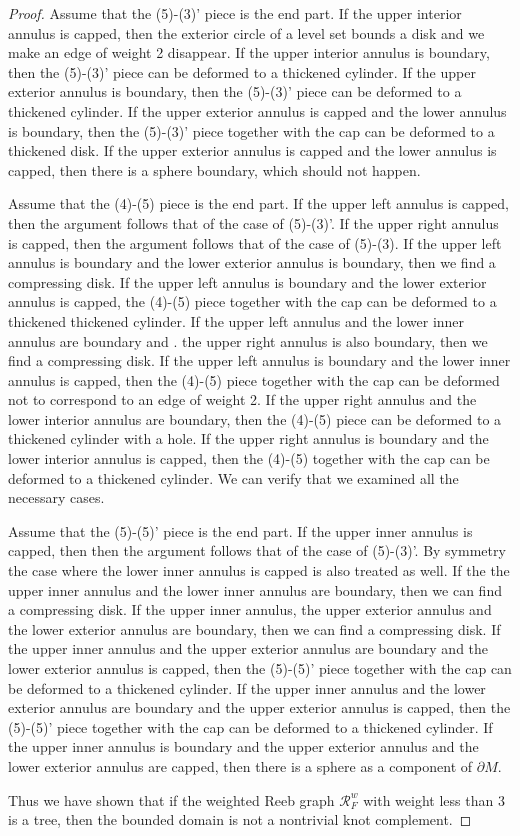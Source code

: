 \documentclass{amsart}
\numberwithin{equation}{section}
\newcommand{\bd}{\partial}
\begin{document}
\begin{proof}
Assume that the (5)-(3)' piece is the end part.
If the upper interior annulus is capped, then the exterior circle of a level set bounds a disk and we make an edge of weight 2 disappear. 
If the upper interior annulus is boundary,  then the (5)-(3)' piece can be deformed to a thickened cylinder.
If the upper exterior annulus is boundary, then the (5)-(3)' piece can be deformed to a thickened cylinder. 
If the upper exterior annulus is capped and the lower annulus is boundary,
then the (5)-(3)' piece together with the cap can be deformed to a thickened disk.
If the upper exterior annulus is capped and the lower annulus is capped,
then there is a sphere boundary, which should not happen.

Assume that the (4)-(5) piece is the end part.
If the upper left annulus is capped, then the argument follows that of the case of (5)-(3)'. If the upper right annulus is capped, then the argument follows that of the case of (5)-(3).
If the upper left annulus is boundary and the lower exterior annulus is boundary, then we find a compressing disk. If the upper left annulus is boundary and the lower exterior annulus is capped, the (4)-(5) piece together with the cap can be deformed to a thickened thickened cylinder. 
If the upper left annulus and the lower inner annulus are boundary and .
the upper right annulus is also boundary, then we find a compressing disk.
If the upper left annulus is boundary and the lower inner annulus is capped,
then the (4)-(5) piece together with the cap can be deformed not to correspond to an edge of weight 2.
If the upper right annulus and the lower interior annulus are boundary, then the (4)-(5) piece can be deformed to a thickened cylinder with a hole. 
If the upper right annulus is boundary and the lower interior annulus is capped,  then the (4)-(5) together with the cap can be deformed to a thickened cylinder. We can verify that we examined all the necessary cases.

Assume that the (5)-(5)' piece is the end part.
If the upper inner annulus is capped, then then the argument follows that of the case of (5)-(3)'. By symmetry the case where the lower inner annulus is capped is also treated as well. If the the upper inner annulus and the lower inner annulus are boundary, then we can find a compressing disk. If the upper inner annulus, the upper exterior annulus and the lower exterior annulus are boundary, then we can find a compressing disk. If the upper inner annulus and the upper exterior annulus are boundary and the lower exterior annulus is capped, then the (5)-(5)' piece together with the cap can be deformed to a thickened cylinder. If the upper inner annulus and the lower exterior annulus are boundary and the upper exterior annulus is capped, then the (5)-(5)' piece together with the cap can be deformed to a thickened cylinder. If the upper inner annulus is boundary and the upper exterior annulus and the lower exterior annulus are capped, then there is a sphere as a component of $\bd M$.

Thus we have shown that if the weighted Reeb graph $\mathcal{R}_F^w$ with weight less than 3 is a tree, then the bounded domain is not a nontrivial knot complement.
\end{proof}
\end{document}
